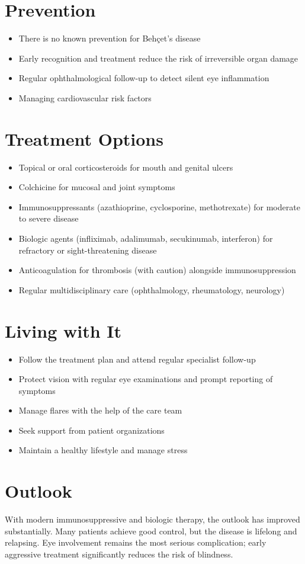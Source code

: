 \section{Prevention}
\begin{itemize}[noitemsep]
  \item There is no known prevention for Behçet's disease
  \item Early recognition and treatment reduce the risk of irreversible organ damage
  \item Regular ophthalmological follow-up to detect silent eye inflammation
  \item Managing cardiovascular risk factors
\end{itemize}
\section{Treatment Options}
\begin{itemize}[noitemsep]
  \item Topical or oral corticosteroids for mouth and genital ulcers
  \item Colchicine for mucosal and joint symptoms
  \item Immunosuppressants (azathioprine, cyclosporine, methotrexate) for moderate to severe disease
  \item Biologic agents (infliximab, adalimumab, secukinumab, interferon) for refractory or sight-threatening disease
  \item Anticoagulation for thrombosis (with caution) alongside immunosuppression
  \item Regular multidisciplinary care (ophthalmology, rheumatology, neurology)
\end{itemize}
\section{Living with It}
\begin{itemize}[noitemsep]
  \item Follow the treatment plan and attend regular specialist follow-up
  \item Protect vision with regular eye examinations and prompt reporting of symptoms
  \item Manage flares with the help of the care team
  \item Seek support from patient organizations
  \item Maintain a healthy lifestyle and manage stress
\end{itemize}
\section{Outlook}
With modern immunosuppressive and biologic therapy, the outlook has improved substantially. Many patients achieve good control, but the disease is lifelong and relapsing. Eye involvement remains the most serious complication; early aggressive treatment significantly reduces the risk of blindness.
